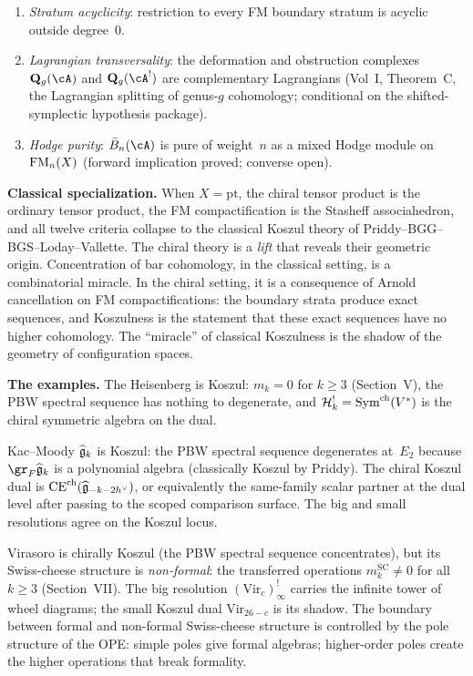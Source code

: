 \begin{enumerate}[label=\textup{(\roman*)},leftmargin=2em,itemsep=2pt]
 bar-relevant range; no singular vectors intrude to create unexpected
 cohomology classes.
\item \emph{Stratum acyclicity}: restriction to every FM boundary
 stratum is acyclic outside degree~$0$.
\item \emph{Lagrangian transversality}: the deformation and
 obstruction complexes $\mathbf{Q}_g(\cA)$ and $\mathbf{Q}_g(\cA^!)$
 are complementary Lagrangians
 (Vol~I, Theorem~C, the Lagrangian splitting of genus-$g$ cohomology;
 conditional on the shifted-symplectic hypothesis package).
\item \emph{Hodge purity}: $\barB_n(\cA)$ is pure of weight~$n$
 as a mixed Hodge module on $\operatorname{FM}_n(X)$ (forward implication proved; converse open).
\end{enumerate}

\medskip\noindent\textbf{Classical specialization.}\enspace
When $X = \mathrm{pt}$, the chiral tensor product is the ordinary
tensor product, the FM compactification is the Stasheff
associahedron, and all twelve criteria collapse to the classical
Koszul theory of Priddy--BGG--BGS--Loday--Vallette. The chiral theory
is a \emph{lift} that reveals their geometric origin. Concentration of
bar cohomology, in the classical setting, is a combinatorial miracle.
In the chiral setting, it is a consequence of Arnold cancellation on
FM compactifications: the boundary strata produce exact sequences,
and Koszulness is the statement that these exact sequences have no
higher cohomology. The ``miracle'' of classical Koszulness is the
shadow of the geometry of configuration spaces.

\medskip\noindent\textbf{The examples.}\enspace
The Heisenberg is Koszul: $m_k = 0$ for $k \geq 3$
(Section~V), the PBW spectral sequence has nothing to degenerate, and
$\mathcal{H}_k^! = \mathrm{Sym}^{\mathrm{ch}}(V^*)$ is the chiral symmetric algebra on the dual.

Kac--Moody $\widehat{\mathfrak{g}}_k$ is Koszul: the PBW spectral sequence
degenerates at~$E_2$ because $\gr_F \widehat{\fg}_k$ is a polynomial
algebra (classically Koszul by Priddy). The chiral Koszul dual is
$\mathrm{CE}^{\mathrm{ch}}(\widehat{\mathfrak{g}}_{-k-2h^\vee})$, or
equivalently the same-family scalar partner at the dual level after
passing to the scoped comparison surface. The big and small
resolutions agree on the Koszul locus.

Virasoro is chirally Koszul (the PBW spectral sequence concentrates),
but its Swiss-cheese structure is \emph{non-formal}: the transferred
operations $m_k^{\mathrm{SC}} \neq 0$ for all $k \geq 3$
(Section~VII). The big resolution $(\mathrm{Vir}_c)^!_\infty$
carries the infinite tower of wheel diagrams; the small Koszul dual
$\mathrm{Vir}_{26-c}$ is its shadow. The boundary between formal
and non-formal Swiss-cheese structure is controlled by the pole
structure of the OPE: simple poles give formal algebras;
higher-order poles create the higher operations that break formality.

